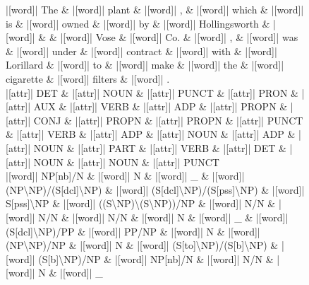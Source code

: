 \documentclass[10pt,a4paper]{article}
\begin{document}
\begin{figure}[h]
{\begin{dependency}[theme = simple]
\begin{deptext}[column sep=1em, row sep=0.1em]
|[word]| The \& |[word]| plant \& |[word]| , \& |[word]| which \& |[word]| is \& |[word]| owned \& |[word]| by \& |[word]| Hollingsworth \& |[word]| \& \& |[word]| Vose \& |[word]| Co. \& |[word]| , \& |[word]| was \& |[word]| under \& |[word]| contract \& |[word]| with \& |[word]| Lorillard \& |[word]| to \& |[word]| make \& |[word]| the \& |[word]| cigarette \& |[word]| filters \& |[word]| . \\
|[attr]| DET \& |[attr]| NOUN \& |[attr]| PUNCT \& |[attr]| PRON \& |[attr]| AUX \& |[attr]| VERB \& |[attr]| ADP \& |[attr]| PROPN \& |[attr]| CONJ \& |[attr]| PROPN \& |[attr]| PROPN \& |[attr]| PUNCT \& |[attr]| VERB \& |[attr]| ADP \& |[attr]| NOUN \& |[attr]| ADP \& |[attr]| NOUN \& |[attr]| PART \& |[attr]| VERB \& |[attr]| DET \& |[attr]| NOUN \& |[attr]| NOUN \& |[attr]| PUNCT \\
|[word]| NP{[}nb{]}/N \& |[word]| N \& |[word]| \_ \& |[word]| (NP\textbackslash{}NP)/(S{[}dcl{]}\textbackslash{}NP) \& |[word]| (S{[}dcl{]}\textbackslash{}NP)/(S{[}pss{]}\textbackslash{}NP) \& |[word]| S{[}pss{]}\textbackslash{}NP \& |[word]| ((S\textbackslash{}NP)\textbackslash{}(S\textbackslash{}NP))/NP \& |[word]| N/N \& |[word]| N/N \& |[word]| N/N \& |[word]| N \& |[word]| \_ \& |[word]| (S{[}dcl{]}\textbackslash{}NP)/PP \& |[word]| PP/NP \& |[word]| N \& |[word]| (NP\textbackslash{}NP)/NP \& |[word]| N \& |[word]| (S{[}to{]}\textbackslash{}NP)/(S{[}b{]}\textbackslash{}NP) \& |[word]| (S{[}b{]}\textbackslash{}NP)/NP \& |[word]| NP{[}nb{]}/N \& |[word]| N/N \& |[word]| N \& |[word]| \_ \\
\end{deptext}




\end{dependency}}
\end{figure}
\end{document}
